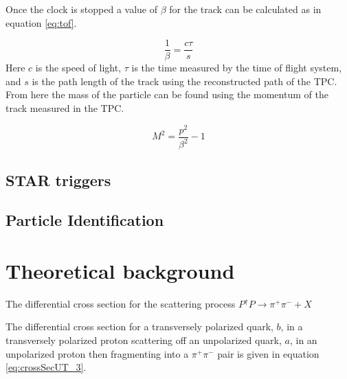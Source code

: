 \documentclass[abstract = on,listof=totoc, bibliography=totoc]{scrreprt}
\newcommand{\phirs}{\phi_{RS}}
\newcommand{\ptpair}{P_{T}^{\pi^+\pi^-}}
\newcommand{\mpair}{M_{inv}^{\pi^+\pi^-}}
\newcommand{\pip}{\pi^+}
\newcommand{\pim}{\pi^-}
\newcommand{\pair}{$\pip\pim$ }
\begin{document}
Once the clock is stopped a value of $\beta$ for the track can be calculated as in equation \ref{eq:tof}. 

\begin{equation}
\label{eq:tof}
\frac{1}{\beta} = \frac{c\tau}{s}
\end{equation}
%
Here $c$ is the speed of light, $\tau$ is the time measured by the time of flight system, and $s$ is the path length of the track using the reconstructed path of the TPC. From here the mass of the particle can be found using the momentum of the track measured in the TPC.

\begin{equation}
\label{eq:mtof}
M^2 = \frac{p^2}{\beta^2} - 1
\end{equation}


\section{STAR triggers}

\section{Particle Identification}

\chapter{Theoretical background}

The differential cross section for the scattering process $P^\uparrow P \rightarrow \pip\pim + X$

The differential cross section for a transversely polarized quark, $b$, in a transversely polarized proton scattering off an unpolarized quark, $a$, in an unpolarized proton then fragmenting into a \pair pair is given in equation \ref{eq:crossSecUT_3}.\cite{bacchettaRedici2}


\end{document}
